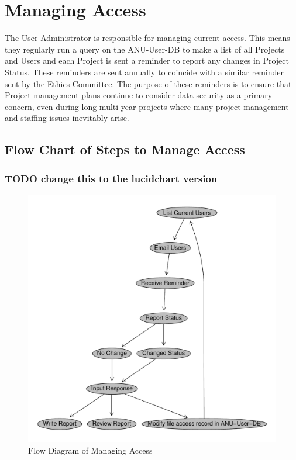 \documentclass[a4paper]{article}
\begin{document}
\section{Managing Access}
\label{sec-4}

The User Administrator is responsible for managing current access.  This means they regularly run a query on the ANU-User-DB to make a list of all Projects and Users and each Project is sent a reminder to report any changes in Project Status.  These reminders are sent annually to coincide with a similar reminder sent by the Ethics Committee.  The purpose of these reminders is to ensure that Project management plans continue to consider data security as a primary concern, even during long multi-year projects where many project management and staffing issues inevitably arise.
\subsection{Flow Chart of Steps to Manage Access}
\label{sec-4-1}
\subsubsection{\textbf{TODO} change this to the lucidchart version}
\label{sec-4-1-1}

\begin{figure}[!h]
\centering
\includegraphics[width=\textwidth]{DataAccessFlowDiagram-ManagingAccess.pdf}
\caption{Flow Diagram of Managing Access}
\label{fig:DataAccessFlowDiagram-ManagingAccess}
\end{figure}
\clearpage
\end{document}

